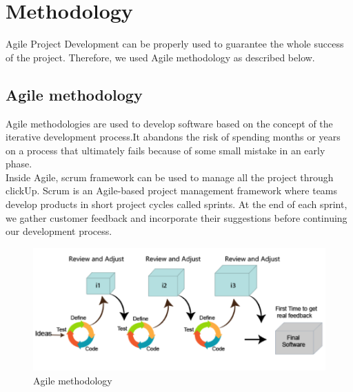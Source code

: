 \chapter{Methodology}
 Agile Project Development can be properly used to guarantee the whole success of the project. Therefore,  we used Agile methodology as described below.
\section{Agile methodology}
 Agile methodologies are used to develop software based on the concept of the iterative development process.It abandons the risk of spending months or years on a process that ultimately fails because of some small mistake in an early phase.\\
Inside Agile, scrum framework can be used to manage all the project through clickUp.
Scrum is an Agile-based project management framework where teams develop products in short project cycles called sprints. At the end of each sprint, we gather customer feedback and incorporate their suggestions before continuing our development process.\\
\begin{figure}[H]
    \centering
    \includegraphics[width=1\textwidth]{img/chapter_4/agile.png}
    \caption{Agile methodology}
\end{figure}
\noindent
